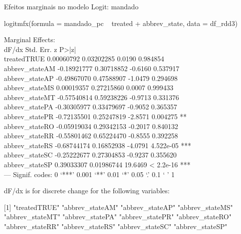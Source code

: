 \documentclass{beamer}
\begin{document}
\begin{frame}{Efeitos marginais no modelo Logit: mandado}
	\begin{tiny}
logitmfx(formula = mandado_pc ~ treated + abbrev_state, data = df_rdd3)

Marginal Effects:\\
dF/dx   Std. Err.       z     P>|z|    \\
treatedTRUE     0.00060792  0.03202285  0.0190  0.984854    \\
abbrev_stateAM -0.18921777  0.30718852 -0.6160  0.537917    \\
abbrev_stateAP -0.49867070  0.47588907 -1.0479  0.294698    \\
abbrev_stateMS  0.00019357  0.27215860  0.0007  0.999433    \\
abbrev_stateMT -0.57540814  0.59238226 -0.9713  0.331376    \\
abbrev_statePA -0.30305977  0.33479697 -0.9052  0.365357    \\
abbrev_statePR -0.72135501  0.25247819 -2.8571  0.004275 ** \\
abbrev_stateRO -0.05919034  0.29342153 -0.2017  0.840132    \\
abbrev_stateRR -0.55801462  0.65224470 -0.8555  0.392258    \\
abbrev_stateRS -0.68744174  0.16852938 -4.0791 4.522e-05 ***\\
abbrev_stateSC -0.25222677  0.27304853 -0.9237  0.355620    \\
abbrev_stateSP  0.39033307  0.01986744 19.6469 < 2.2e-16 ***\\
---
Signif. codes:  0 ‘***’ 0.001 ‘**’ 0.01 ‘*’ 0.05 ‘.’ 0.1 ‘ ’ 1

dF/dx is for discrete change for the following variables:

[1] "treatedTRUE"    "abbrev_stateAM" "abbrev_stateAP" "abbrev_stateMS"\\
[5] "abbrev_stateMT" "abbrev_statePA" "abbrev_statePR" "abbrev_stateRO"\\
[9] "abbrev_stateRR" "abbrev_stateRS" "abbrev_stateSC" "abbrev_stateSP"\\
\end{tiny}
\end{frame}
\end{document}
